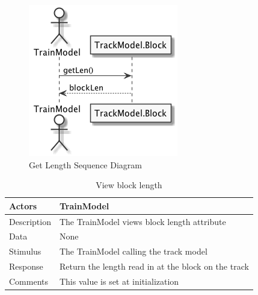 \documentclass[]{article}
\begin{document}
\begin{figure}[H]
	\centering
	\includegraphics[scale=.5]{getLen.png}
	\caption{Get Length Sequence Diagram}
\end{figure}
\begin{table}[H]
	\centering
	\caption{View block length}
	\begin{tabular}{|l|l|}
		\hline
		Actors & \parbox[t]{10cm}{TrainModel} \\ \hline
		Description & \parbox[t]{10cm}{The TrainModel views block length attribute} \\ \hline
		Data &  \parbox[t]{10cm}{None} \\ \hline
		Stimulus &  \parbox[t]{10cm}{The TrainModel calling the track model} \\ \hline
		Response & \parbox[t]{10cm}{Return the length read in at the block on the track}\\ \hline
		Comments & \parbox[t]{10cm}{This value is set at initialization}  \\ \hline
	\end{tabular}
\end{table}
\end{document}
